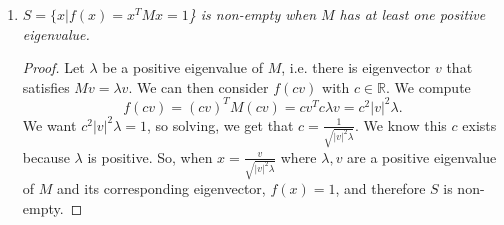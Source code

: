 \documentclass[12pt]{article}
\newcommand{\magnitude}[1]{\left\lvert #1 \right\rvert}
\begin{document}
\begin{enumerate}[label=\Alph*., leftmargin=*]
\begin{enumerate}[label=.\Alph*]
        \item \textit{$S=\{x|f(x)=x^{T}Mx=1$\} is non-empty when $M$ has at least one positive eigenvalue.} 
        \begin{proof}
            Let $\lambda$ be a positive eigenvalue of $M$, i.e. there is eigenvector $v$ that satisfies $Mv=\lambda v$. We can then consider $f(cv)$ with $c\in \mathbb{R}$. We compute\begin{equation*}
                f(cv)={(cv)}^{T}M(cv)=cv^{T}c\lambda v=c^2\magnitude{v}^2\lambda.
            \end{equation*} We want $c^2\magnitude{v}^2\lambda = 1$, so solving, we get that $c=\frac{1}{\sqrt{\magnitude{v}^2\lambda}}$. We know this $c$ exists because $\lambda$ is positive.
            So, when $x=\frac{v}{\sqrt{\magnitude{v}^2\lambda}}$ where $\lambda, v$ are a positive eigenvalue of $M$ and its corresponding eigenvector, $f(x)=1$, and therefore $S$ is non-empty.
        \end{proof}
    \end{enumerate}
\end{enumerate}
\end{document}
